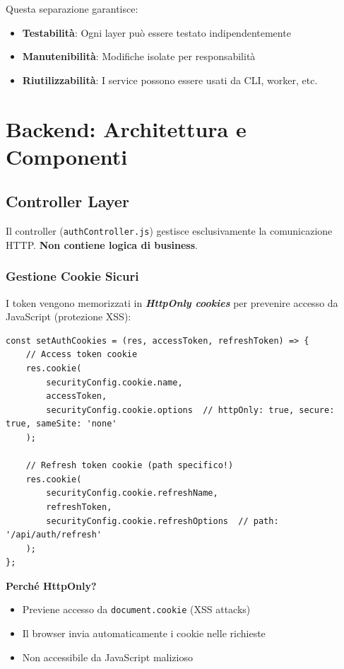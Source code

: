 \documentclass[11pt,a4paper]{article}
\newcommand{\code}[1]{\texttt{#1}}
\newcommand{\tech}[1]{\textbf{\textit{#1}}}
\newcommand{\important}[1]{\textcolor{red!80!black}{\textbf{#1}}}
\begin{document}
Questa separazione garantisce:
\begin{itemize}
    \item \textbf{Testabilità}: Ogni layer può essere testato indipendentemente
    \item \textbf{Manutenibilità}: Modifiche isolate per responsabilità
    \item \textbf{Riutilizzabilità}: I service possono essere usati da CLI, worker, etc.
\end{itemize}

\section{Backend: Architettura e Componenti}

\subsection{Controller Layer}

Il controller (\code{authController.js}) gestisce esclusivamente la comunicazione HTTP. \important{Non contiene logica di business}.

\subsubsection{Gestione Cookie Sicuri}

I token vengono memorizzati in \tech{HttpOnly cookies} per prevenire accesso da JavaScript (protezione XSS):

\begin{lstlisting}[caption=Impostazione Cookie Sicuri]
const setAuthCookies = (res, accessToken, refreshToken) => {
    // Access token cookie
    res.cookie(
        securityConfig.cookie.name,
        accessToken,
        securityConfig.cookie.options  // httpOnly: true, secure: true, sameSite: 'none'
    );

    // Refresh token cookie (path specifico!)
    res.cookie(
        securityConfig.cookie.refreshName,
        refreshToken,
        securityConfig.cookie.refreshOptions  // path: '/api/auth/refresh'
    );
};
\end{lstlisting}

\textbf{Perché HttpOnly?}
\begin{itemize}
    \item Previene accesso da \code{document.cookie} (XSS attacks)
    \item Il browser invia automaticamente i cookie nelle richieste
    \item Non accessibile da JavaScript malizioso
\end{itemize}
\end{document}
